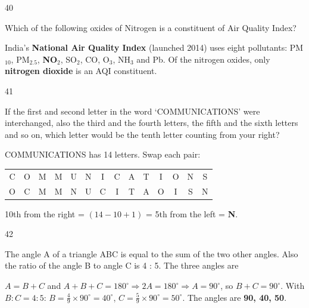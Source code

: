 \begin{question}{40}
{Which of the following oxides of Nitrogen is a constituent of Air Quality Index?\par}
\begin{explain}
India's \textbf{National Air Quality Index} (launched 2014) uses eight pollutants: PM$_{10}$, PM$_{2.5}$, \textbf{NO$_2$}, SO$_2$, CO, O$_3$, NH$_3$ and Pb. Of the nitrogen oxides, only \textbf{nitrogen dioxide} is an AQI constituent.
\end{explain}
\end{question}

\begin{question}{41}
{If the first and second letter in the word `COMMUNICATIONS' were interchanged, also the third and the fourth letters, the fifth and the sixth letters and so on, which letter would be the tenth letter counting from your right?\par}
\begin{explain}
COMMUNICATIONS has 14 letters. Swap each pair:
\begin{center}\ttfamily
\begin{tabular}{*{14}{c}}
C&O&M&M&U&N&I&C&A&T&I&O&N&S\\
O&C&M&M&N&U&C&I&T&A&O&I&S&N\\
\end{tabular}
\end{center}
10th from the right = $(14-10+1)$ = 5th from the left = \textbf{N}.
\end{explain}
\end{question}

\begin{question}{42}
{The angle A of a triangle ABC is equal to the sum of the two other angles. Also the ratio of the angle B to angle C is 4 : 5. The three angles are\par}
\optsfour{90\textdegree{}, 40\textdegree{}, 50\textdegree{}}{90\textdegree{}, 55\textdegree{}, 35\textdegree{}}{90\textdegree{}, 60\textdegree{}, 30\textdegree{}}{90\textdegree{}, 70\textdegree{}, 20\textdegree{}}
\begin{explain}
$A=B+C$ and $A+B+C=180^\circ \Rightarrow 2A=180^\circ \Rightarrow A=90^\circ$, so $B+C=90^\circ$.
With $B:C=4:5$: $B=\tfrac49\times90^\circ=40^\circ$, $C=\tfrac59\times90^\circ=50^\circ$. The angles are \textbf{90\textdegree, 40\textdegree, 50\textdegree}.
\end{explain}
\end{question}

